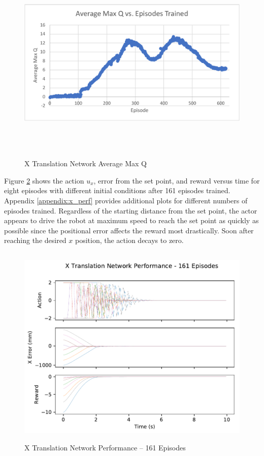 \begin{figure}[H]
	\centering
	\includegraphics[width=6in, height=3.85in, keepaspectratio]{figures/train_figs/x_q.pdf}
	\caption{X Translation Network Average Max Q} \label{fig:x_q}
\end{figure}

Figure \ref{fig:x_perf} shows the action $u_x$, error from the set point, and reward versus time for eight episodes with different initial conditions after 161 episodes trained. Appendix \ref{appendix:x_perf} provides additional plots for different numbers of episodes trained. Regardless of the starting distance from the set point, the actor appears to drive the robot at maximum speed to reach the set point as quickly as possible since the positional error affects the reward most drastically. Soon after reaching the desired $x$ position, the action decays to zero.
\begin{figure}[H]
	\centering
	\includegraphics[width=6in, height=3.85in, keepaspectratio]{figures/train_figs/transx_transitions/1_161.pdf}
	\caption{X Translation Network Performance -- 161 Episodes}\label{fig:x_perf}
\end{figure}

